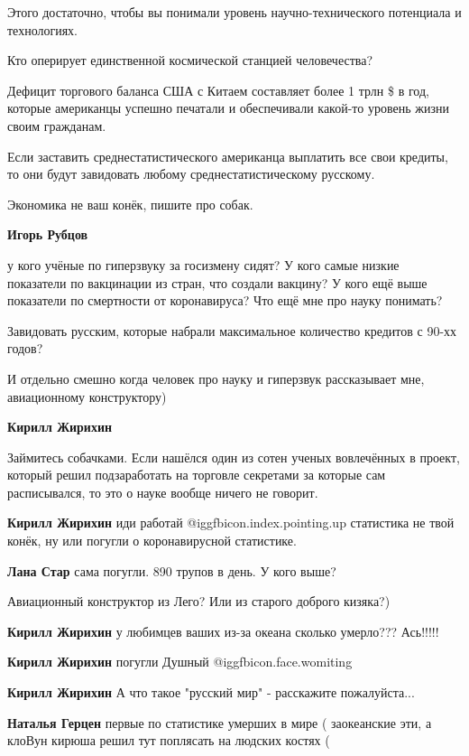 \begin{itemize}
\begin{itemize}
Этого достаточно, чтобы вы понимали уровень научно-технического потенциала и технологиях.

Кто оперирует единственной космической станцией человечества?

Дефицит торгового баланса США с Китаем составляет более 1 трлн \$ в год, которые
американцы успешно печатали и обеспечивали какой-то уровень жизни своим
гражданам.

Если заставить среднестатистического американца выплатить все свои кредиты, то
они будут завидовать любому среднестатистическому русскому.

Экономика не ваш конёк, пишите про собак.

\textbf{Игорь Рубцов} 

у кого учёные по гиперзвуку за госизмену сидят? У кого самые низкие показатели
по вакцинации из стран, что создали вакцину? У кого ещё выше показатели по
смертности от коронавируса? Что ещё мне про науку понимать?

Завидовать русским, которые набрали максимальное количество кредитов с 90-хх
годов?

И отдельно смешно когда человек про науку и гиперзвук рассказывает мне,
авиационному конструктору)


\textbf{Кирилл Жирихин}

Займитесь собачками. Если нашёлся один из сотен ученых вовлечённых в проект,
который решил подзаработать на торговле секретами за которые сам расписывался,
то это о науке вообще ничего не говорит.

\textbf{Кирилл Жирихин} иди работай @igg{fbicon.index.pointing.up} статистика не твой конёк, ну или погугли о коронавирусной статистике.

\textbf{Лана Стар} сама погугли. 890 трупов в день. У кого выше?

Авиационный конструктор из Лего? Или из старого доброго кизяка?)

\textbf{Кирилл Жирихин} у любимцев ваших из-за океана сколько умерло??? Ась!!!!!

\textbf{Кирилл Жирихин} погугли Душный  @igg{fbicon.face.womiting} 

\textbf{Кирилл Жирихин} А что такое "русский мир" - расскажите пожалуйста...

\textbf{Наталья Герцен} первые по статистике умерших в мире ( заокеанские эти, а клоВун кирюша решил тут поплясать на людских костях (


\end{itemize}
\end{itemize}

